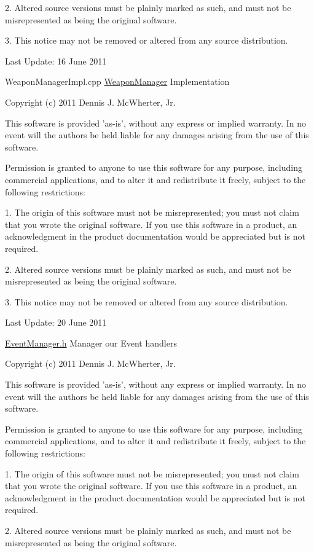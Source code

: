 2. Altered source versions must be plainly marked as such, and must not be misrepresented as being the original software.

3. This notice may not be removed or altered from any source distribution.

Last Update: 16 June 2011

WeaponManagerImpl.cpp \hyperlink{class_micro_f_p_s_1_1_weapon_manager}{WeaponManager} Implementation

Copyright (c) 2011 Dennis J. McWherter, Jr.

This software is provided 'as-\/is', without any express or implied warranty. In no event will the authors be held liable for any damages arising from the use of this software.

Permission is granted to anyone to use this software for any purpose, including commercial applications, and to alter it and redistribute it freely, subject to the following restrictions:

1. The origin of this software must not be misrepresented; you must not claim that you wrote the original software. If you use this software in a product, an acknowledgment in the product documentation would be appreciated but is not required.

2. Altered source versions must be plainly marked as such, and must not be misrepresented as being the original software.

3. This notice may not be removed or altered from any source distribution.

Last Update: 20 June 2011

\hyperlink{_event_manager_8h_source}{EventManager.h} Manager our Event handlers

Copyright (c) 2011 Dennis J. McWherter, Jr.

This software is provided 'as-\/is', without any express or implied warranty. In no event will the authors be held liable for any damages arising from the use of this software.

Permission is granted to anyone to use this software for any purpose, including commercial applications, and to alter it and redistribute it freely, subject to the following restrictions:

1. The origin of this software must not be misrepresented; you must not claim that you wrote the original software. If you use this software in a product, an acknowledgment in the product documentation would be appreciated but is not required.

2. Altered source versions must be plainly marked as such, and must not be misrepresented as being the original software.

